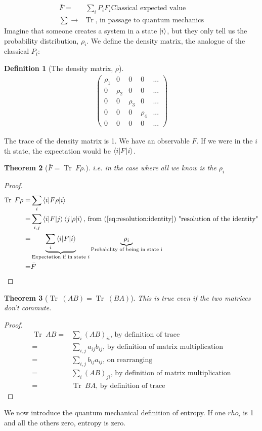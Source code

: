\documentclass[]{article}
\newtheorem{thm}{Theorem}
\newtheorem{defn}[thm]{Definition}
\DeclareMathOperator{\Tr}{Tr \;}
\begin{document}
\begin{align*}
	\bar{F} =& \sum_i P_i F_i \text{Classical expected value}\\
	\sum \rightarrow& \Tr \text{, in passage to quantum mechanics}
\end{align*}
Imagine that someone creates a system in a state $\ket{i}$, but they only tell us the probability distribution, $\rho_i$. We define the density matrix, the analogue of the classical $P_i$:
\begin{defn}[The density matrix, $\rho$]
	\begin{align*}
		\begin{pmatrix}
			\rho_1&0&0&0&...\\
			0&\rho_2&0&0&...\\
			0&0&\rho_3&0&...\\
			0&0&0&\rho_4&...\\
			0&0&0&0&...
		\end{pmatrix}
	\end{align*}
\end{defn}
The trace of the density matrix is 1.
We have an observable $F$. If we were in the $i$th state, the expectation would be $\braket{i\vert F \vert i}$.
\begin{thm}[$\bar{F}= \Tr F \rho$.]
	i.e. in the case where all we know is the $\rho_i$
\end{thm}
\begin{proof}
	\begin{align*}
		\Tr F \rho=&\sum_i \braket{i \vert F \rho \vert i}\\
		=& \sum_{i,j} \braket{i \vert F \vert j} \braket{j \vert \rho \vert i} \text{, from (\ref{eq:resolution:identity}) "resolution of the identity"}\\
		=& \underbrace{\sum_i \braket{i \vert F \vert i}}_\text{Expectation if in state $i$} \underbrace{\rho_i}_\text{Probability of being in state i}\\
		=& \bar{F}
	\end{align*}
\end{proof}

\begin{thm}[$\Tr(AB)=\Tr(BA)$]This is true even if the two matrices don't commute.
\end{thm}
\begin{proof}
	\begin{align*}
		\Tr AB =& \sum_i (AB)_{ii} \text{, by definition of trace}\\
		=& \sum_{i,j} a_{ij} b_{ij} \text{, by definition of matrix multiplication}\\
		=& \sum_{i,j} b_{ij} a_{ij} \text{, on rearranging}\\
		=& \sum_i (AB)_{ji} \text{, by definition of matrix multiplication}\\
		=& \Tr BA \text{, by definition of trace}
	\end{align*}
\end{proof}
We now introduce the quantum mechanical definition of entropy. If one $rho_i$ is 1 and all the others zero, entropy is zero.
\end{document}

